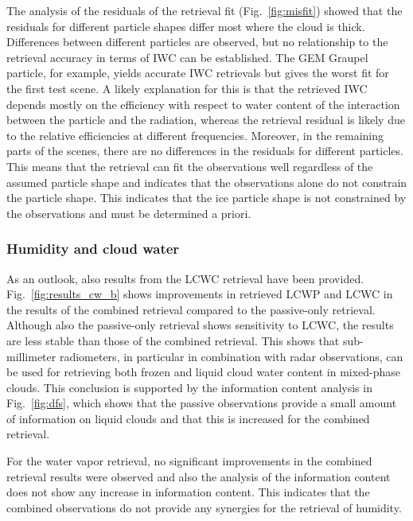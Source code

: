 \documentclass[journal abbreviation, manuscript]{copernicus}
\begin{document}
The analysis of the residuals of the retrieval fit (Fig.~\ref{fig:misfit})
showed that the residuals for different particle shapes differ most where the
cloud is thick. Differences between different particles are observed, but no
relationship to the retrieval accuracy in terms of IWC can be established. The
GEM Graupel particle, for example, yields accurate IWC retrievals but gives the
worst fit for the first test scene. A likely explanation for this is that the
retrieved IWC depends mostly on the efficiency with respect to water content of
the interaction between the particle and the radiation, whereas the retrieval
residual is likely due to the relative efficiencies at different frequencies.
Moreover, in the remaining parts of the scenes, there are no differences in the
residuals for different particles. This means that the retrieval can fit the
observations well regardless of the assumed particle shape and indicates that
the observations alone do not constrain the particle shape. This indicates that
the ice particle shape is not constrained by the observations and must be
determined a priori.

\subsubsection{Humidity and cloud water}

As an outlook, also results from the LCWC retrieval have been provided.
Fig.~\ref{fig:results_cw_b} shows improvements in retrieved LCWP and LCWC in the
results of the combined retrieval compared to the passive-only retrieval.
Although also the passive-only retrieval shows sensitivity to LCWC, the results
are less stable than those of the combined retrieval. This shows that
sub-millimeter radiometers, in particular in combination with radar
observations, can be used for retrieving both frozen and liquid cloud water
content in mixed-phase clouds. This conclusion is supported by the information
content analysis in Fig.~\ref{fig:dfs}, which shows that the passive
observations provide a small amount of information on liquid clouds and that
this is increased for the combined retrieval.

For the water vapor retrieval, no significant improvements in the combined
retrieval results were observed and also the analysis of the information content
does not show any increase in information content. This indicates that the
combined observations do not provide any synergies for the retrieval of
humidity.
\end{document}
